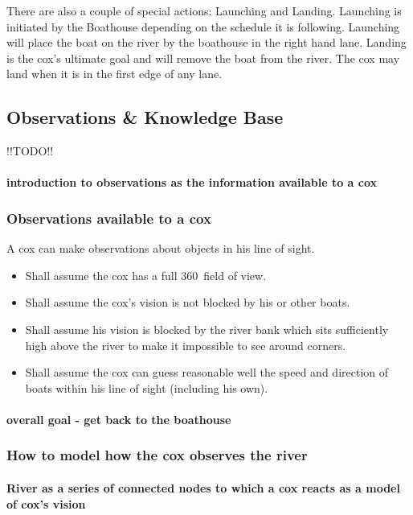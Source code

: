       There are also a couple of special actions: Launching and Landing. Launching is initiated by the Boathouse depending on the schedule it is following. Launching will place the boat on the river by the boathouse in the right hand lane. Landing is the cox's ultimate goal and will remove the boat from the river. The cox may land when it is in the first edge of any lane.
      
      \subsection{Observations \& Knowledge Base} \label{model:cox:obs}
      !!TODO!!
      \paragraph{introduction to observations as the information available to a cox}
      
      \subsubsection{Observations available to a cox}
      
      
      A cox can make observations about objects in his line of sight.
      \begin{itemize}
        \item Shall assume the cox has a full 360\textdegree\ field of
          view.
        \item Shall assume the cox's vision is not blocked by his or other boats.
        \item Shall assume his
        vision is blocked by the river bank which sits sufficiently high
        above the river to make it impossible to see around corners.
        \item Shall assume the cox can guess reasonable well the speed and
        direction of boats within his line of sight (including his own).
      \end{itemize}
        \paragraph{overall goal - get back to the boathouse}
      \subsubsection{How to model how the cox observes the river}
        \paragraph{River as a series of connected nodes to which a cox reacts as a model of cox's vision}
